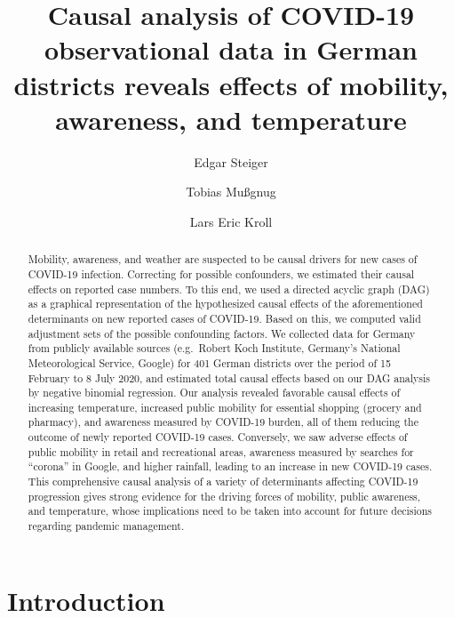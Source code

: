 \documentclass[]{elsarticle} %
\begin{document}
\begin{frontmatter}

  \title{Causal analysis of COVID-19 observational data in German districts reveals effects of mobility, awareness, and temperature}
    \author[Zi]{Edgar Steiger}
    \author[Zi]{Tobias Mußgnug}
    \author[Zi]{Lars Eric Kroll}
      \address[Zi]{Central Research Institute of Ambulatory Health Care in Germany (Zi), Salzufer 8, D-10587 Berlin, Germany}
    
  \begin{abstract}
  Mobility, awareness, and weather are suspected to be causal drivers for new cases of COVID-19 infection. Correcting for possible confounders, we estimated their causal effects on reported case numbers. To this end, we used a directed acyclic graph (DAG) as a graphical representation of the hypothesized causal effects of the aforementioned determinants on new reported cases of COVID-19. Based on this, we computed valid adjustment sets of the possible confounding factors. We collected data for Germany from publicly available sources (e.g.~Robert Koch Institute, Germany's National Meteorological Service, Google) for 401 German districts over the period of 15 February to 8 July 2020, and estimated total causal effects based on our DAG analysis by negative binomial regression. Our analysis revealed favorable causal effects of increasing temperature, increased public mobility for essential shopping (grocery and pharmacy), and awareness measured by COVID-19 burden, all of them reducing the outcome of newly reported COVID-19 cases. Conversely, we saw adverse effects of public mobility in retail and recreational areas, awareness measured by searches for ``corona'' in Google, and higher rainfall, leading to an increase in new COVID-19 cases. This comprehensive causal analysis of a variety of determinants affecting COVID-19 progression gives strong evidence for the driving forces of mobility, public awareness, and temperature, whose implications need to be taken into account for future decisions regarding pandemic management.
  \end{abstract}
  
 \end{frontmatter}

\hypertarget{introduction}{%
\section{Introduction}\label{introduction}}
\end{document}

